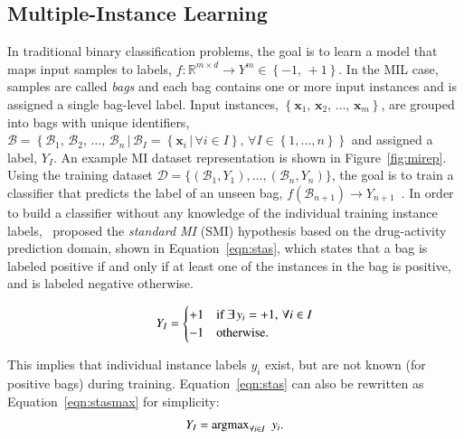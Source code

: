 \documentclass[preprint,12pt]{elsarticle}
\newcommand{\set}[1]{{\left\{#1\right\}}}
\newcommand{\st}{{\,|\,}}
\newcommand{\reals}{{\mathbb R}}
\begin{document}
\subsection{Multiple-Instance Learning}\label{subsec:mil}
\begin{sloppypar}
In traditional binary classification problems, the goal is to learn a model that maps input samples to labels, $f: \reals^{m \times d} \rightarrow Y^m \in \set{-1,\,+1}$. In the MIL case, samples are called \textit{bags} and each bag contains one or more input instances and is assigned a single bag-level label. Input instances, $\set{\bm x_1,\, \bm x_2,\, \ldots,\, \bm x_m}$, are grouped into bags with unique identifiers, $\mathcal{B} = \set{\mathcal{B}_1,\, \mathcal{B}_2,\, \ldots,\, \mathcal{B}_n \st \mathcal{B}_I = \set{\bm x_i \st \forall i \in I},\, \forall I \in \set{1, \ldots, n}}$ and assigned a label, $Y_I$. An example MI dataset representation is shown in Figure~\ref{fig:mirep}. Using the training dataset $\mathcal{D} = \{(\mathcal{B}_1,Y_1), \ldots, (\mathcal{B}_n,Y_n)\}$, the goal is to train a classifier that predicts the label of an unseen bag, $f(\mathcal{B}_{n+1}) \rightarrow Y_{n+1}$~\citep{Amores2013}. In order to build a classifier without any knowledge of the individual training instance labels,~\citet{Dietterich1997} proposed the \textit{standard MI} (SMI) hypothesis based on the drug-activity prediction domain, shown in Equation~\eqref{eqn:stas}, which states that a bag is labeled positive if and only if at least one of the instances in the bag is positive, and is labeled negative otherwise.
\end{sloppypar}
\begin{equation}
\centering \label{eqn:stas}
 Y_I = \begin{cases}
			+1 & \text{if }\exists\, y_i = +1,\, \forall i \in I \\
			-1 & \text{otherwise}.
		  \end{cases}
\end{equation}

This implies that individual instance labels $y_i$ exist, but are not known (for positive bags) during training. Equation~\eqref{eqn:stas} can also be rewritten as Equation~\eqref{eqn:stasmax} for simplicity:
\begin{equation}
\centering \label{eqn:stasmax}
Y_I = \text{argmax}_{\forall i \in I}\,\,\, y_i.
\end{equation}
\end{document}
